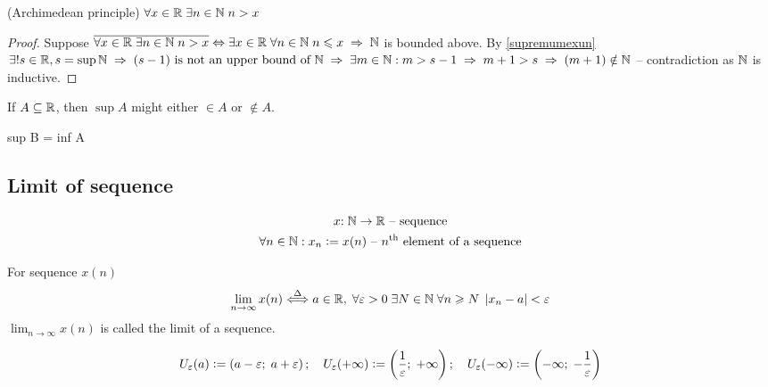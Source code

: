 \begin{theorem}
    (Archimedean principle) $\forall x \in \mathbb{R} \; \exists n \in \mathbb{N} \; n > x$
\end{theorem}
\begin{proof}
    Suppose $\overline{\forall x \in \RR \; \exists n \in \NN \; n > x} \Leftrightarrow \exists x \in \RR \; \forall n \in \NN \; n \le x \thus \NN$ is bounded above. By \ref{supremumexun} $\exists! s \in \RR, s = \sup{\NN} \thus (s - 1) \text{ is not an upper bound of $\NN$} \thus \exists m \in \NN : m > s - 1 \hm{\thus} m + 1 > s \thus (m + 1) \notin \NN$ -- contradiction as $\mathbb{N}$ is inductive.
\end{proof}

\begin{note}
    If $A \subseteq \mathbb{R}$, then $\sup{A}$ might either $\in A$ or $\notin A$.
\end{note}

\begin{theorem}
    sup B = inf A
\end{theorem}

\subsection{Limit of sequence}
\begin{equation}
    \begin{gathered}
        x{:}\; \mathbb{N} \rightarrow \mathbb{R} \text{ -- sequence} \\
        \forall n \in \mathbb{N} : x_n \vcentcolon= x(n) \text{ -- $n^{\rm th}$ element of a sequence}
    \end{gathered}
\end{equation}

For sequence $x(n)$
\begin{equation}
    \lim_{n \to \infty} x(n) \stackrel{\Delta}{\Longleftrightarrow} a \in \mathbb{R},\; \forall \varepsilon > 0 \; \exists N \in \mathbb{N} \; \forall n \geqslant N \; \left\lvert x_n - a \right\rvert < \varepsilon
\end{equation}
$\lim_{n \rightarrow \infty} x(n)$ is called the limit of a sequence.

\begin{equation}
    U_\varepsilon(a) \vcentcolon= \left(a - \varepsilon;\; a + \varepsilon\right); \quad
    U_\varepsilon(+\infty) \vcentcolon= \left(\frac{1}{\varepsilon};\; +\infty\right); \quad
    U_\varepsilon(-\infty) \vcentcolon= \left(-\infty;\; -\frac{1}{\varepsilon}\right)
\end{equation}


